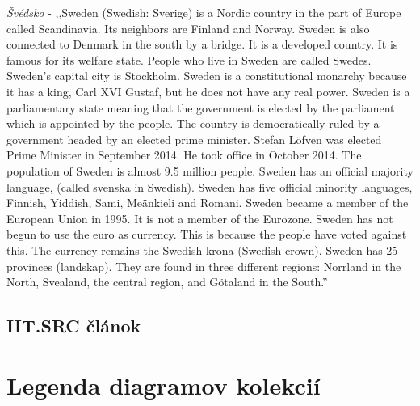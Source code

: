 \noindent
\textit{Švédsko} - ,,Sweden (Swedish: Sverige) is a Nordic country in the part of Europe called Scandinavia. Its neighbors are Finland and Norway. Sweden is also connected to Denmark in the south by a bridge. It is a developed country. It is famous for its welfare state. People who live in Sweden are called Swedes. Sweden's capital city is Stockholm. Sweden is a constitutional monarchy because it has a king, Carl XVI Gustaf, but he does not have any real power. Sweden is a parliamentary state meaning that the government is elected by the parliament which is appointed by the people. The country is democratically ruled by a government headed by an elected prime minister. Stefan Löfven was elected Prime Minister in September 2014. He took office in October 2014. The population of Sweden is almost 9.5 million people. Sweden has an official majority language, (called svenska in Swedish). Sweden has five official minority languages, Finnish, Yiddish, Sami, Meänkieli and Romani. Sweden became a member of the European Union in 1995. It is not a member of the Eurozone. Sweden has not begun to use the euro as currency. This is because the people have voted against this. The currency remains the Swedish krona (Swedish crown). Sweden has 25 provinces (landskap). They are found in three different regions: Norrland in the North, Svealand, the central region, and Götaland in the South.''

\newpage
{}
{
	\section{IIT.SRC článok}
}
{
	\chapter{Legenda diagramov kolekcií}
}

\afterpage{\null\newpage}
